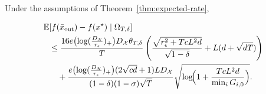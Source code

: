 \documentclass[runningheads]{llncs}
\begin{document}
\begin{proposition}\label{prop:expected-rate-explicit}
Under the assumptions of Theorem~\ref{thm:expected-rate},

\begin{align}
\label{eq:expected-rate-main}
\mathbb E&\!\left[f(\bar x_{\mathrm{out}})-f(x^\star)\mid \Omega_{T,\delta}\right]\\
&\le
\frac{16e\bigl(\log(\frac{D_{\mathcal{X}}}{r_\epsilon})_{+}\bigr)D_{\mathcal{X}}\theta_{T,\delta}}{T}
\left(
\frac{\sqrt{r_\epsilon^2+TcL^2d}}{\sqrt{1-\delta}}
+
L(d+\sqrt{dT})
\right)
\nonumber\\
&\quad+
\frac{e\bigl(\log(\frac{D_{\mathcal{X}}}{r_\epsilon})_{+}\bigr)(2\sqrt{cd}+1)L D_{\mathcal{X}}}
{(1-\delta)(1-\sigma)\sqrt{T}}
\sqrt{\log\!\Bigl(1+\frac{TcL^2d}{\min_i G_{i,0}}\Bigr)}.
\end{align}

\end{proposition}
\end{document}

